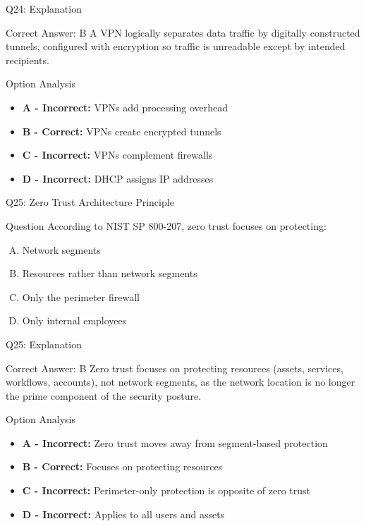\documentclass{beamer}
\begin{document}
	\begin{frame}{Q24: Explanation}
		\begin{block}{Correct Answer: B}
			A VPN logically separates data traffic by digitally constructed tunnels, configured with encryption so traffic is unreadable except by intended recipients.
		\end{block}
		\begin{block}{Option Analysis}
			\begin{itemize}
				\item \textbf{A - Incorrect:} VPNs add processing overhead
				\item \textbf{B - Correct:} VPNs create encrypted tunnels
				\item \textbf{C - Incorrect:} VPNs complement firewalls
				\item \textbf{D - Incorrect:} DHCP assigns IP addresses
			\end{itemize}
		\end{block}
	\end{frame}
	
	\begin{frame}{Q25: Zero Trust Architecture Principle}
		\begin{block}{Question}
			According to NIST SP 800-207, zero trust focuses on protecting:
		\end{block}
		\begin{enumerate}[(A)]
			\item Network segments
			\item Resources rather than network segments
			\item Only the perimeter firewall
			\item Only internal employees
		\end{enumerate}
	\end{frame}
	
	\begin{frame}{Q25: Explanation}
		\begin{block}{Correct Answer: B}
			Zero trust focuses on protecting resources (assets, services, workflows, accounts), not network segments, as the network location is no longer the prime component of the security posture.
		\end{block}
		\begin{block}{Option Analysis}
			\begin{itemize}
				\item \textbf{A - Incorrect:} Zero trust moves away from segment-based protection
				\item \textbf{B - Correct:} Focuses on protecting resources
				\item \textbf{C - Incorrect:} Perimeter-only protection is opposite of zero trust
				\item \textbf{D - Incorrect:} Applies to all users and assets
			\end{itemize}
		\end{block}
	\end{frame}
	
\end{document}
